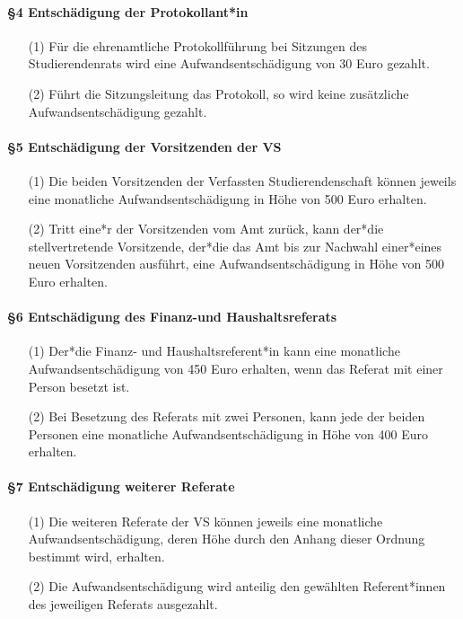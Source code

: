    \paragraph{§4 Entschädigung der Protokollant*in}
        \begin{itemize}
            \item[(1)] Für die ehrenamtliche Protokollführung bei Sitzungen des Studierendenrats wird eine Aufwandsentschädigung von 30 Euro gezahlt.
            \item[(2)] Führt die Sitzungsleitung das Protokoll, so wird keine zusätzliche Aufwandsentschädigung gezahlt.
        \end{itemize}
    \paragraph{§5 Entschädigung der Vorsitzenden der VS}
        \begin{itemize}
            \item[(1)] Die beiden Vorsitzenden der Verfassten Studierendenschaft können jeweils eine monatliche Aufwandsentschädigung in Höhe von 500 Euro erhalten.
            \item[(2)] Tritt eine*r der Vorsitzenden vom Amt zurück, kann der*die stellvertretende Vorsitzende, der*die das Amt bis zur Nachwahl einer*eines neuen Vorsitzenden ausführt, eine Aufwandsentschädigung in Höhe von 500 Euro erhalten. 
        \end{itemize}
    \paragraph{§6 Entschädigung des Finanz-und Haushaltsreferats}
        \begin{itemize}
            \item[(1)] Der*die Finanz- und Haushaltsreferent*in kann eine monatliche Aufwandsentschädigung von 450 Euro erhalten, wenn das Referat mit einer Person besetzt ist.
            \item[(2)] Bei Besetzung des Referats mit zwei Personen, kann jede der beiden Personen eine monatliche Aufwandsentschädigung in Höhe von 400 Euro erhalten. 
        \end{itemize}
    \paragraph{§7 Entschädigung weiterer Referate}
        \begin{itemize}
            \item[(1)]  Die weiteren Referate der VS können jeweils eine monatliche Aufwandsentschädigung, deren Höhe durch den Anhang dieser Ordnung bestimmt wird, erhalten. 
            \item[(2)]  Die Aufwandsentschädigung wird anteilig den gewählten Referent*innen des jeweiligen Referats ausgezahlt.
        \end{itemize}
